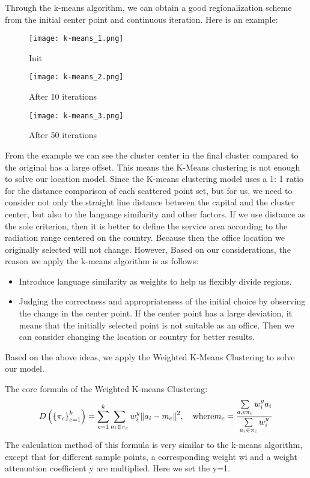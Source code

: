 \documentclass[12pt]{article}  %
\begin{document}
Through the k-means algorithm, we can obtain a good regionalization scheme from the initial center point and continuous iteration. Here is an example:

\begin{figure}[H]
	\begin{minipage}[t]{0.3\linewidth}
		\centering
		\texttt{[image: k-means\_1.png]}
		\caption{Init}
	\end{minipage}%
	\hfill
	\begin{minipage}[t]{0.3\linewidth}
		\centering
		\texttt{[image: k-means\_2.png]}
		\caption{After 10 iterations}
	\end{minipage}
	\hfill
	\begin{minipage}[t]{0.3\linewidth}
		\centering
		\texttt{[image: k-means\_3.png]}
		\caption{After 50 iterations}
	\end{minipage}
\end{figure}

From the example we can see the cluster center in the final cluster compared to the original has a large offset. This means the K-Means clustering is not enough to solve our location model. Since the K-means clustering model uses a 1: 1 ratio for the distance comparison of each scattered point set, but for us, we need to consider not only the straight line distance between the capital and the cluster center, but also to the language similarity and other factors. If we use distance as the sole criterion, then it is better to define the service area according to the radiation range centered on the country. Because then the office location we originally selected will not change. However, Based on our considerations, the reason we apply the k-means algorithm is as follows:
\begin{itemize}
	\item Introduce language similarity as weights to help us flexibly divide regions.
	\item Judging the correctness and appropriateness of the initial choice by observing the change in the center point. If the center point has a large deviation, it means that the initially selected point is not suitable as an office. Then we can consider changing the location or country for better results.
\end{itemize}

Based on the above ideas, we apply the Weighted K-Means Clustering to solve our model.

The core formula of the Weighted K-means Clustering:
\begin{equation}
	D\left( {\left\{ {{\pi _c}} \right\}_{c = 1}^k} \right) = \sum\limits_{c = 1}^k {\sum\limits_{{a_i} \in {\pi _c}} {w_i^y} } {\left\| {{a_i} - {m_c}} \right\|^2},\quad {\rm{ where }}{m_c} = \frac{{\sum\limits_{a,e{\pi _c}} {w_i^y} {a_i}}}{{\sum\limits_{{a_i} \in {\pi _c}} {w_i^y} }}
\end{equation}
The calculation method of this formula is very similar to the k-means algorithm, except that for different sample points, a corresponding weight wi and a weight attenuation coefficient y are multiplied. Here we set the y=1.
\end{document}
